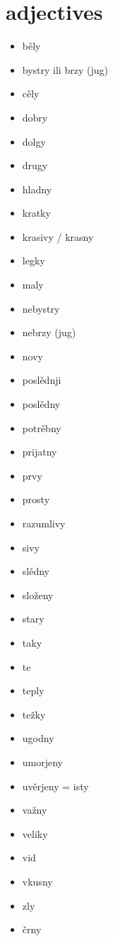 \documentclass{article}
\begin{document}
\newpage
\section*{adjectives}

\begin{multicols}{2}
\begin{itemize}
 \item běly
\item bystry ili brzy (jug)
\item cěly
\item dobry
\item dolgy
\item drugy
\item hladny
\item kratky
\item krasivy / krasny
\item legky
\item maly
\item nebystry 
\item nebrzy (jug)
\item novy
\item poslědnji
\item poslědny
\item potrěbny
\item prijatny
\item prvy
\item prosty
\item razumlivy
\item sivy
\item slědny
\item složeny 
\item stary
\item taky
\item te
\item teply
\item težky
\item ugodny
\item umorjeny
\item uvěrjeny = isty
\item važny
\item veliky
\item vid
\item vkusny
\item zly
\item črny

\end{itemize}
\end{multicols}

\small
\setlength{\tabcolsep}{2pt}
\renewcommand{\arraystretch}{1.1}
\end{document}
